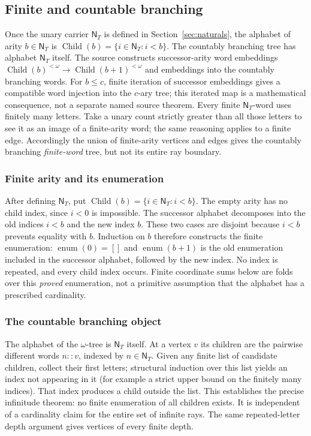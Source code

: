 \documentclass[11pt,reqno]{amsart}
\theoremstyle{definition}\newtheorem{definition}[theorem]{Definition}
\theoremstyle{remark}\newtheorem{remark}[theorem]{Remark}
\newcommand{\N}{\mathsf N_T}\newcommand{\Z}{\mathsf Z_T}\newcommand{\Q}{\mathsf Q_T}\newcommand{\RR}{\mathsf R}
\newcommand{\Fin}{\operatorname{Child}}
\begin{document}
\subsection{Finite and countable branching}\label{main:sub-04}
Once the unary carrier $\N$ is defined in Section~\ref{sec:naturals}, the alphabet of arity $b\in\N$ is $\Fin(b)=\{i\in\N:i<b\}$. The countably branching tree has alphabet $\N$ itself. The source constructs successor-arity word embeddings $\Fin(b)^{<\omega}\to\Fin(b+1)^{<\omega}$ and embeddings into the countably branching words. For $b\le c$, finite iteration of successor embeddings gives a compatible word injection into the $c$-ary tree; this iterated map is a mathematical consequence, not a separate named source theorem. Every finite $\N$-word uses finitely many letters. Take a unary count strictly greater than all those letters to see it as an image of a finite-arity word; the same reasoning applies to a finite edge. Accordingly the union of finite-arity vertices and edges gives the countably branching \emph{finite-word} tree, but not its entire ray boundary.


\medskip
\subsubsection*{Finite arity and its enumeration}\label{supp:2-4}
After defining $\N$, put $\Fin(b)=\{i\in\N:i<b\}$. The empty arity has no child index, since $i<0$ is impossible. The successor alphabet decomposes into the old indices $i<b$ and the new index $b$. These two cases are disjoint because $i<b$ prevents equality with $b$. Induction on $b$ therefore constructs the finite enumeration: $\operatorname{enum}(0)=[]$ and $\operatorname{enum}(b+1)$ is the old enumeration included in the successor alphabet, followed by the new index. No index is repeated, and every child index occurs. Finite coordinate sums below are folds over this \emph{proved} enumeration, not a primitive assumption that the alphabet has a prescribed cardinality.
\medskip
\medskip
\subsubsection*{The countable branching object}\label{supp:2-5}
The alphabet of the $\omega$-tree is $\N$ itself. At a vertex $v$ its children are the pairwise different words $n::v$, indexed by $n\in\N$. Given any finite list of candidate children, collect their first letters; structural induction over this list yields an index not appearing in it (for example a strict upper bound on the finitely many indices). That index produces a child outside the list. This establishes the precise infinitude theorem: no finite enumeration of all children exists. It is independent of a cardinality claim for the entire set of infinite rays. The same repeated-letter depth argument gives vertices of every finite depth.
\medskip
\medskip
\end{document}
